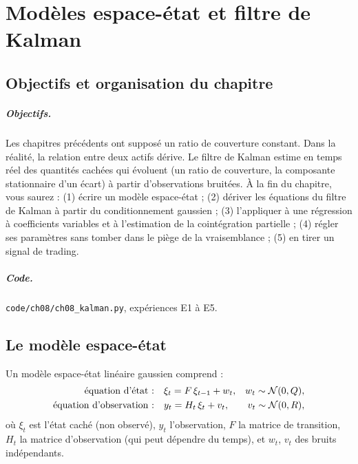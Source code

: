 \chapter{Modèles espace-état et filtre de Kalman}
\label{ch:8}

\section{Objectifs et organisation du chapitre}

\paragraph{Objectifs.} Les chapitres précédents ont supposé un ratio de couverture constant. Dans la réalité, la relation entre deux actifs dérive. Le filtre de Kalman estime en temps réel des quantités cachées qui évoluent (un ratio de couverture, la composante stationnaire d'un écart) à partir d'observations bruitées. À la fin du chapitre, vous saurez : (1) écrire un modèle espace-état ; (2) dériver les équations du filtre de Kalman à partir du conditionnement gaussien ; (3) l'appliquer à une régression à coefficients variables et à l'estimation de la cointégration partielle ; (4) régler ses paramètres sans tomber dans le piège de la vraisemblance ; (5) en tirer un signal de trading.

\paragraph{Code.} \texttt{code/ch08/ch08\_kalman.py}, expériences E1 à E5.

\section{Le modèle espace-état}

\begin{definition}
Un modèle espace-état linéaire gaussien comprend :
\begin{align*}
\text{équation d'état :}\quad & \xi_t = F\,\xi_{t-1} + w_t, & w_t\sim\mathcal{N}(0,Q),\\
\text{équation d'observation :}\quad & y_t = H_t\,\xi_t + v_t, & v_t\sim\mathcal{N}(0,R),
\end{align*}
où $\xi_t$ est l'état caché (non observé), $y_t$ l'observation, $F$ la matrice de transition, $H_t$ la matrice d'observation (qui peut dépendre du temps), et $w_t$, $v_t$ des bruits indépendants.
\end{definition}

